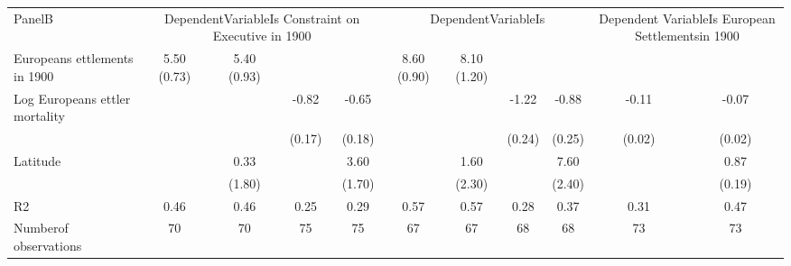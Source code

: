 \begin{table}[htbp]
\centering
\begin{tabular}{lcccccccccc}
\hline
PanelB & \multicolumn{4}{c}{DependentVariableIs Constraint on Executive in 1900} & \multicolumn{4}{c}{DependentVariableIs} & \multicolumn{2}{c}{Dependent VariableIs European Settlementsin 1900} \\
Europeans ettlements in 1900 & 5.50 (0.73) & 5.40 (0.93) &  &  & 8.60 (0.90) & 8.10 (1.20) &  &  &  &  \\
Log Europeans ettler mortality &  &  & -0.82 & -0.65 &  &  & -1.22 & -0.88 & -0.11 & -0.07 \\
 &  &  & (0.17) & (0.18) &  &  & (0.24) & (0.25) & (0.02) & (0.02) \\
Latitude &  & 0.33 &  & 3.60 &  & 1.60 &  & 7.60 &  & 0.87 \\
 &  & (1.80) &  & (1.70) &  & (2.30) &  & (2.40) &  & (0.19) \\
R2 & 0.46 & 0.46 & 0.25 & 0.29 & 0.57 & 0.57 & 0.28 & 0.37 & 0.31 & 0.47 \\
Numberof observations & 70 & 70 & 75 & 75 & 67 & 67 & 68 & 68 & 73 & 73 \\
\hline
\end{tabular}
\end{table}
